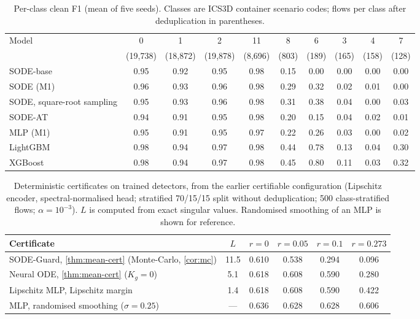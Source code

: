 \documentclass{article}
\theoremstyle{definition}
\begin{document}
\begin{table}[h]
\caption{Per-class clean F1 (mean of five seeds). Classes are ICS3D container
scenario codes; flows per class after deduplication in parentheses.}
\label{tab:perclass}
\centering\small
\setlength{\tabcolsep}{3.5pt}
\begin{tabular}{lccccccccc}
\toprule
Model & 0 & 1 & 2 & 11 & 8 & 6 & 3 & 4 & 7\\
 & {\scriptsize(19{,}738)} & {\scriptsize(18{,}872)} & {\scriptsize(19{,}878)} & {\scriptsize(8{,}696)} & {\scriptsize(803)} & {\scriptsize(189)} & {\scriptsize(165)} & {\scriptsize(158)} & {\scriptsize(128)}\\
\midrule
SODE-base & 0.95 & 0.92 & 0.95 & 0.98 & 0.15 & 0.00 & 0.00 & 0.00 & 0.00\\
SODE (M1) & 0.96 & 0.93 & 0.96 & 0.98 & 0.29 & 0.32 & 0.02 & 0.01 & 0.00\\
SODE, square-root sampling & 0.95 & 0.93 & 0.96 & 0.98 & 0.31 & 0.38 & 0.04 & 0.00 & 0.03\\
SODE-AT & 0.94 & 0.91 & 0.95 & 0.98 & 0.20 & 0.15 & 0.04 & 0.02 & 0.01\\
MLP (M1) & 0.95 & 0.91 & 0.95 & 0.97 & 0.22 & 0.26 & 0.03 & 0.00 & 0.02\\
LightGBM & 0.98 & 0.94 & 0.97 & 0.98 & 0.44 & 0.78 & 0.13 & 0.04 & 0.30\\
XGBoost & 0.98 & 0.94 & 0.97 & 0.98 & 0.45 & 0.80 & 0.11 & 0.03 & 0.32\\
\bottomrule
\end{tabular}
\end{table}

\begin{table}[h]
\caption{Deterministic certificates on trained detectors, from the earlier
certifiable configuration (Lipschitz encoder, spectral-normalised head;
stratified 70/15/15 split without deduplication; 500 class-stratified flows;
$\alpha=10^{-3}$). $L$ is computed from exact singular values. Randomised
smoothing of an MLP is shown for reference.}
\label{tab:det-cert}
\centering\small
\begin{tabular}{lccccc}
\toprule
Certificate & $L$ & $r=0$ & $r=0.05$ & $r=0.1$ & $r=0.273$\\
\midrule
SODE-Guard, \cref{thm:mean-cert} (Monte-Carlo, \cref{cor:mc}) & 11.5 & 0.610 & 0.538 & 0.294 & 0.096\\
Neural ODE, \cref{thm:mean-cert} ($K_g=0$) & 5.1 & 0.618 & 0.608 & 0.590 & 0.280\\
Lipschitz MLP, Lipschitz margin & 1.4 & 0.618 & 0.608 & 0.590 & 0.422\\
MLP, randomised smoothing ($\sigma=0.25$) & --- & 0.636 & 0.628 & 0.628 & 0.606\\
\bottomrule
\end{tabular}
\end{table}
\end{document}
